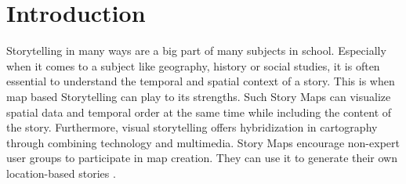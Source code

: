 \section{Introduction}
Storytelling in many ways are a big part of many subjects in school. Especially when it comes to a subject like geography, history or social studies, it is often essential to understand the temporal and spatial context of a story. This is when map based Storytelling can play to its strengths. Such Story Maps can visualize spatial data and temporal order at the same time while including the content of the story. Furthermore, visual storytelling offers hybridization in cartography through combining technology and multimedia. Story Maps encourage non-expert user groups to participate in map creation. They can use it to generate their own location-based stories \parencite{kerski2015}.

